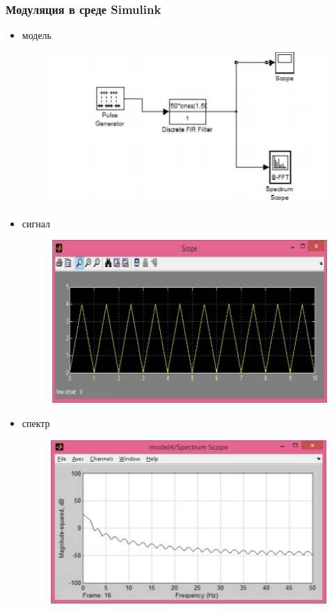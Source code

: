 \documentclass[10pt,a4paper]{article}
\begin{document}
\subsubsection{Модуляция в среде Simulink}
\begin{itemize}
\item модель
\begin{figure}[h]
\centering
\includegraphics[width=12cm]{sim5_7.png} 
\end{figure}
\item сигнал
\begin{figure}[h]
\centering
\includegraphics[width=12cm]{sim5_8.png} 
\end{figure}
\item спектр
\begin{figure}[h]
\centering
\includegraphics[width=12cm]{sim5_9.png} 
\end{figure}
\end{itemize}
\FloatBarrier
\end{document}

